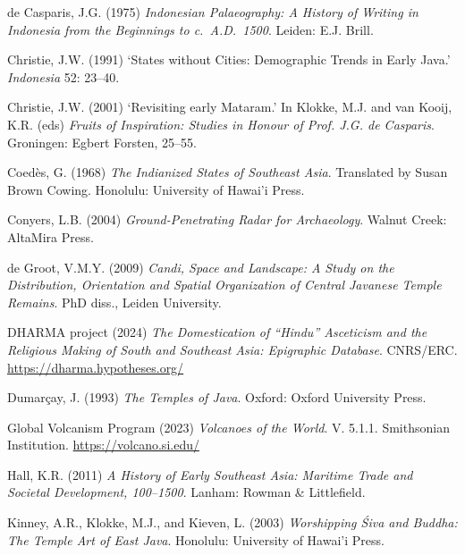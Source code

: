 \documentclass[12pt,a4paper]{article}
\begin{document}
\vspace{0.5em}
\noindent de Casparis, J.G. (1975) \emph{Indonesian Palaeography: A History of Writing in Indonesia from the Beginnings to c.~A.D.~1500}. Leiden: E.J. Brill.

\vspace{0.5em}
\noindent Christie, J.W. (1991) `States without Cities: Demographic Trends in Early Java.' \emph{Indonesia} 52: 23--40.

\vspace{0.5em}
\noindent Christie, J.W. (2001) `Revisiting early Mataram.' In Klokke, M.J. and van Kooij, K.R. (eds) \emph{Fruits of Inspiration: Studies in Honour of Prof. J.G. de Casparis}. Groningen: Egbert Forsten, 25--55.

\vspace{0.5em}
\noindent Coed\`{e}s, G. (1968) \emph{The Indianized States of Southeast Asia}. Translated by Susan Brown Cowing. Honolulu: University of Hawai'i Press.

\vspace{0.5em}
\noindent Conyers, L.B. (2004) \emph{Ground-Penetrating Radar for Archaeology}. Walnut Creek: AltaMira Press.

\vspace{0.5em}
\noindent de Groot, V.M.Y. (2009) \emph{Candi, Space and Landscape: A Study on the Distribution, Orientation and Spatial Organization of Central Javanese Temple Remains}. PhD diss., Leiden University.

\vspace{0.5em}
\noindent DHARMA project (2024) \emph{The Domestication of ``Hindu'' Asceticism and the Religious Making of South and Southeast Asia: Epigraphic Database}. CNRS/ERC. \url{https://dharma.hypotheses.org/}

\vspace{0.5em}
\noindent Dumar\c{c}ay, J. (1993) \emph{The Temples of Java}. Oxford: Oxford University Press.

\vspace{0.5em}
\noindent Global Volcanism Program (2023) \emph{Volcanoes of the World}. V. 5.1.1. Smithsonian Institution. \url{https://volcano.si.edu/}

\vspace{0.5em}
\noindent Hall, K.R. (2011) \emph{A History of Early Southeast Asia: Maritime Trade and Societal Development, 100--1500}. Lanham: Rowman \& Littlefield.

\vspace{0.5em}
\noindent Kinney, A.R., Klokke, M.J., and Kieven, L. (2003) \emph{Worshipping \'{S}iva and Buddha: The Temple Art of East Java}. Honolulu: University of Hawai'i Press.
\end{document}
